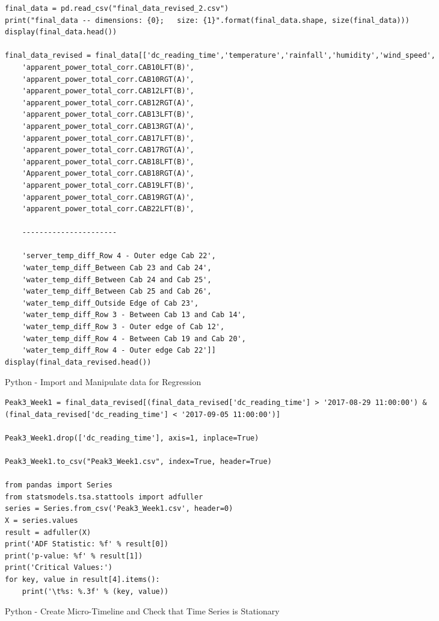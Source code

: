 \documentclass[12pt]{scrartcl}
\begin{document}
\begin{listing}[H]
\begin{verbatim}
final_data = pd.read_csv("final_data_revised_2.csv")
print("final_data -- dimensions: {0};   size: {1}".format(final_data.shape, size(final_data)))
display(final_data.head())

final_data_revised = final_data[['dc_reading_time','temperature','rainfall','humidity','wind_speed',
    'apparent_power_total_corr.CAB10LFT(B)',
    'apparent_power_total_corr.CAB10RGT(A)',
    'apparent_power_total_corr.CAB12LFT(B)',
    'apparent_power_total_corr.CAB12RGT(A)',
    'apparent_power_total_corr.CAB13LFT(B)',
    'apparent_power_total_corr.CAB13RGT(A)',
    'apparent_power_total_corr.CAB17LFT(B)',
    'apparent_power_total_corr.CAB17RGT(A)',
    'apparent_power_total_corr.CAB18LFT(B)',
    'Apparent_power_total_corr.CAB18RGT(A)',
    'apparent_power_total_corr.CAB19LFT(B)',
    'apparent_power_total_corr.CAB19RGT(A)',
    'apparent_power_total_corr.CAB22LFT(B)',

	----------------------

    'server_temp_diff_Row 4 - Outer edge Cab 22',
    'water_temp_diff_Between Cab 23 and Cab 24',
    'water_temp_diff_Between Cab 24 and Cab 25',
    'water_temp_diff_Between Cab 25 and Cab 26',
    'water_temp_diff_Outside Edge of Cab 23',
    'water_temp_diff_Row 3 - Between Cab 13 and Cab 14',
    'water_temp_diff_Row 3 - Outer edge of Cab 12',
    'water_temp_diff_Row 4 - Between Cab 19 and Cab 20',
    'water_temp_diff_Row 4 - Outer edge Cab 22']]
display(final_data_revised.head())

\end{verbatim}
\caption{Python - Import and Manipulate data for Regression}
\label{list:[Python - Import and Manipulate data for Regression]}
\end{listing}

\begin{listing}[H]
\begin{verbatim}
Peak3_Week1 = final_data_revised[(final_data_revised['dc_reading_time'] > '2017-08-29 11:00:00') & (final_data_revised['dc_reading_time'] < '2017-09-05 11:00:00')]

Peak3_Week1.drop(['dc_reading_time'], axis=1, inplace=True)

Peak3_Week1.to_csv("Peak3_Week1.csv", index=True, header=True)

from pandas import Series
from statsmodels.tsa.stattools import adfuller
series = Series.from_csv('Peak3_Week1.csv', header=0)
X = series.values
result = adfuller(X)
print('ADF Statistic: %f' % result[0])
print('p-value: %f' % result[1])
print('Critical Values:')
for key, value in result[4].items():
	print('\t%s: %.3f' % (key, value))

\end{verbatim}
\caption{Python - Create Micro-Timeline and Check that Time Series is Stationary}
\label{list:[Python - Create Micro-Timeline and Check that Time Series is Stationary]}
\end{listing}
\end{document}
